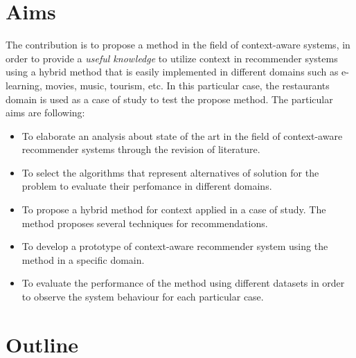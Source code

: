 \section{Aims}

The contribution is to propose a method in the field of
context-aware systems, in order to provide a
\textit{useful knowledge} to utilize context in recommender systems
using a hybrid method that is easily implemented in different domains
such as e-learning, movies, music, tourism, etc. In this particular
case, the restaurants domain is used as a case of study to  test the
propose method. The particular aims are following:
\begin{itemize}  
\item To elaborate an analysis about state of the art in the field
of context-aware recommender systems through  the revision of
literature. 
\item To select the algorithms that represent alternatives of 
solution for the problem to evaluate their perfomance in different domains.
\item To propose a hybrid method for context applied in a case of study.  
The method proposes several techniques for recommendations.
\item To develop a prototype of context-aware recommender system 
using the method in a specific domain.
\item To evaluate the performance of the method using 
different datasets in order to observe the system behaviour 
for each particular case.
\end{itemize} 

\section{Outline}

